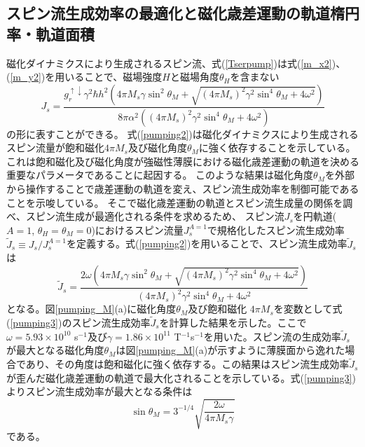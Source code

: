 \subsection{スピン流生成効率の最適化と磁化歳差運動の軌道楕円率・軌道面積}
磁化ダイナミクスにより生成されるスピン流、式(\ref{Tserpump})は式(\ref{m_x2})、(\ref{m_y2})を用いることで、磁場強度$H$と磁場角度$\theta_H$を含まない
\begin{equation}
J_s=\frac{ g^{\uparrow\downarrow}_r \gamma^2  \hbar h^2 \left(4 \pi  M_s \gamma  \sin ^2\theta_M+\sqrt{ (4 \pi
 M_s)^2 \gamma ^2 \sin ^4\theta_M+4 \omega ^2}\right)}{8 \pi \alpha^2  \left((4 \pi  M_s)^2 \gamma ^2 \sin ^4\theta_M+4 \omega ^2\right)}\label{pumping2}
\end{equation}
の形に表すことができる。
式(\ref{pumping2})は磁化ダイナミクスにより生成されるスピン流量が飽和磁化$4\pi M_s$及び磁化角度$\theta_M$に強く依存することを示している。これは飽和磁化及び磁化角度が強磁性薄膜における磁化歳差運動の軌道を決める重要なパラメータであることに起因する。
このような結果は磁化角度$\theta_M$を外部から操作することで歳差運動の軌道を変え、スピン流生成効率を制御可能であることを示唆している。
そこで磁化歳差運動の軌道とスピン流生成量の関係を調べ、スピン流生成が最適化される条件を求めるため、
スピン流$J_s$を円軌道($A=1$, $\theta_H=\theta_M=0$)におけるスピン流量$J_s^{A=1}$で規格化したスピン流生成効率${\tilde J}_s\equiv J_s / J_s^{A=1}$を定義する。式(\ref{pumping2})を用いることで、スピン流生成効率${\tilde J}_s$は
\begin{equation}
{\tilde J}_s= \frac{2\omega\left(4 \pi  M_s   \gamma  \sin ^2\theta_M+\sqrt{(4 \pi
 M_s)^2 \gamma ^2 \sin ^4\theta_M+4 \omega ^2}\right)}{(4 \pi  M_s)^2 \gamma ^2 \sin ^4\theta_M+4 \omega ^2}\label{pumping3}
\end{equation}
となる。図\ref{pumping_M}(a)に磁化角度$\theta_M$及び飽和磁化 $4\pi M_s$を変数として式(\ref{pumping3})のスピン流生成効率${\tilde J}_s$を計算した結果を示した。ここで $\omega=5.93\times 10^{10}$ s$^{-1}$及び$\gamma=1.86\times 10^{11}$ T$^{-1}$s$^{-1}$を用いた。スピン流の生成効率${\tilde J}_s$が最大となる磁化角度$\theta_M$は図\ref{pumping_M}(a)が示すように薄膜面から逸れた場合であり、その角度は飽和磁化に強く依存する。この結果はスピン流生成効率${\tilde J}_s$が歪んだ磁化歳差運動の軌道で最大化されることを示している。式(\ref{pumping3})よりスピン流生成効率が最大となる条件は
\begin{equation}
\sin \theta_M  = 3^{-1/4}\sqrt {\frac{{2\omega }}{{4\pi M_s \gamma }}} \label{max}
\end{equation}
である。








